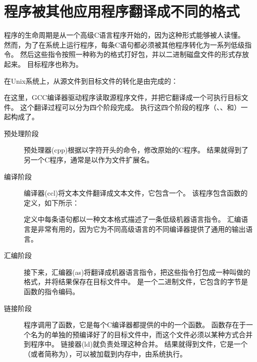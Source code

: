 \section{程序被其他应用程序翻译成不同的格式}
{
    程序的生命周期是从一个高级C语言程序开始的，因为这种形式能够被人读懂。
    然而，为了在系统上运行程序，每条C语句都必须被其他程序转化为一系列低级指令。
    然后这些指令按照一种称为的格式打好包，并以二进制磁盘文件的形式存放起来。
    目标程序也称为。

    在Unix系统上，从源文件到目标文件的转化是由完成的：

    \begin{codelist}
        
    \end{codelist}

    在这里，GCC编译器驱动程序读取源程序文件，并把它翻译成一个可执行目标文件。
    这个翻译过程可以分为四个阶段完成。
    执行这四个阶段的程序（、、和）一起构成了。

    \begin{description}
        \item[预处理阶段]
        {
            预处理器(cpp)根据以字符\emcode{\#}开头的命令，修改原始的C程序。
            结果就得到了另一个C程序，通常是以作为文件扩展名。
        }
        \item[编译阶段]
        {
            编译器(ccl)将文本文件翻译成文本文件，它包含一个。
            该程序包含函数的定义，如下所示：

            \begin{codelist}
                
            \end{codelist}

            定义中每条语句都以一种文本格式描述了一条低级机器语言指令。
            汇编语言是非常有用的，因为它为不同高级语言的不同编译器提供了通用的输出语言。
        }
        \item[汇编阶段]
        {
            接下来，汇编器(as)将翻译成机器语言指令，把这些指令打包成一种叫做的格式，并将结果保存在目标文件中。
            是一个二进制文件，它包含的字节是函数的指令编码。
        }
        \item[链接阶段]
        {
            程序调用了函数，它是每个C编译器都提供的中的一个函数。
            函数存在于一个名为的单独的预编译好了的目标文件中，而这个文件必须以某种方式合并到程序中。
            链接器(ld)就负责处理这种合并。
            结果就得到文件，它是一个（或者简称为），可以被加载到内存中，由系统执行。
        }
    \end{description}

}
